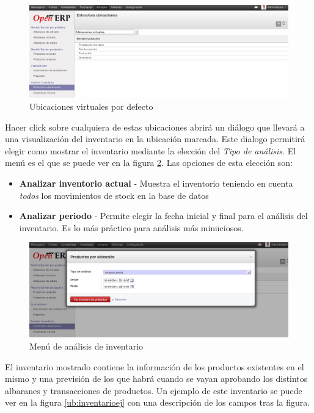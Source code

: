 \begin{figure}[H]
\includegraphics[width=\textwidth]{almacen/img/ubi_virtual.png}
\caption{Ubicaciones virtuales por defecto}
\label{ub:virtuales}
\end{figure}


Hacer click sobre cualquiera de estas ubicaciones abrirá un diálogo que llevará a una visualización del inventario en la ubicación marcada. Este dialogo permitirá elegir como mostrar el inventario mediante la elección del \emph{Tipo de análisis}. El menú es el que se puede ver en la figura \ref{ub:inventariomenu}. Las opciones de esta elección son:


\begin{itemize}
  \item \textbf{Analizar inventorio actual} - Muestra el inventorio teniendo en cuenta \emph{todos} los movimientos de stock
                                            en la base de datos
  \item \textbf{Analizar periodo} - Permite elegir la fecha inicial y final para el análisis del inventario. Es lo más
                                   práctico para análisis más minuciosos.
\end{itemize}

\begin{figure}[H]
\includegraphics[width=\textwidth]{almacen/img/ubi_invent_menu.png}
\caption{Menú de análisis de inventario}
\label{ub:inventariomenu}
\end{figure}


El inventario mostrado contiene la información de los productos existentes en el mismo y una previsión de los que habrá cuando se vayan aprobando los distintos albaranes y transacciones de productos. Un ejemplo de este inventario se puede ver en la figura \ref{ub:inventarioej} con una descripción de los campos tras la figura.

